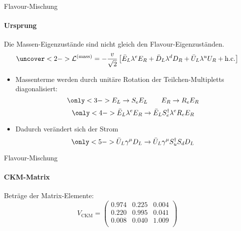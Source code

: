 \begin{frame}{Flavour-Mischung}
\framesubtitle{Ursprung}
Die Massen-Eigenzustände sind nicht gleich den Flavour-Eigenzuständen.
\[ \uncover<2->{\mathcal{L}^{(\text{mass})} = -\frac{v}{\sqrt{2}}\left[ \bar{E}_L\lambda^e E_R  + \bar{D}_L \lambda^dD_R + \bar{U}_L\lambda^u U_R + \text{h.c.}\right]} \]
\begin{itemize}
	\item<3-> Massenterme werden durch unitäre Rotation der Teilchen-Multipletts diagonalisiert: \[ \only<3->{E_L \rightarrow S_eE_L \qquad E_R \rightarrow R_eE_R} \]
	\[ \only<4->{\bar{E}_L\lambda^e E_R \rightarrow \bar{E}_LS_e^\dagger\lambda^eR_e E_R} \]
	\item<5-> Dadurch verändert sich der Strom
	\[ \only<5->{\bar{U}_L\gamma^\mu D_L \rightarrow \bar{U}_L\gamma^\mu S_u^\dagger S_dD_L} \]
\end{itemize}
\end{frame}
\begin{frame}{Flavour-Mischung}
\framesubtitle{CKM-Matrix}
Beträge der Matrix-Elemente: \[ V_\text{CKM} = \begin{pmatrix}
	0.974 & 0.225 & 0.004 \\
	0.220 & 0.995 & 0.041 \\
	0.008 & 0.040 & 1.009 \\
\end{pmatrix} \]
\end{frame}